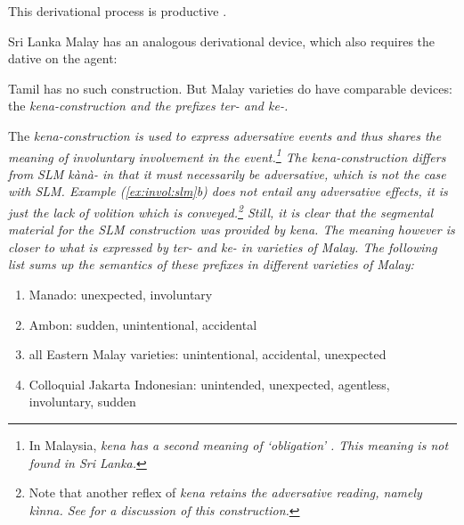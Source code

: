 \documentclass[a4paper,10pt]{article}
\begin{document}
This derivational process is productive \citep{Gair1991infl}.


Sri Lanka Malay has an analogous derivational device, which also requires the dative on the agent:



Tamil has no such construction. But Malay varieties do have comparable devices: the \em kena\em-construction and the prefixes \em ter- \em and \em ke-\em.

The \em kena\em-construction \citep{Chung2005kena} is used to express adversative events and thus shares the meaning of involuntary involvement in the event.\footnote{In
 Malaysia, \em kena \em has a second meaning of `obligation' \citep{WahabEtAl2010}.
This meaning is not found in Sri Lanka.} The \em kena\em-construction differs from SLM \em kànà-  \em in that it must necessarily be adversative, which is not the case with SLM. Example (\ref{ex:invol:slm}b) does not entail any adversative effects, it is just the lack of volition which is conveyed.\footnote{Note
 that another reflex of \em kena \em retains the adversative reading, namely \em kìnna\em. See \citet[187-192]{Nordhoff2009phd} for a discussion of this construction.}
Still, it is clear that the segmental material for the SLM construction was provided by \em kena\em. The meaning however is closer to what is expressed by \em ter- \em and \em ke- \em in varieties of Malay. The following list sums up the semantics of these prefixes in different varieties of Malay:

\begin{enumerate}
 \item Manado: unexpected, involuntary \citep[22]{Stoel2005}
 \item Ambon: sudden, unintentional, accidental \citep[99]{Vanminde1997}
 \item all Eastern Malay varieties: unintentional, accidental,  unexpected \citep[237]{Paauw2008phd}
 \item Colloquial Jakarta Indonesian: unintended, unexpected, agentless, involuntary, sudden \citep{Sneddon2006}
\end{enumerate}
\end{document}
